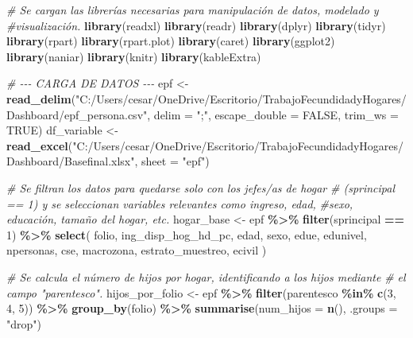 \documentclass[
]{article}
\newenvironment{Shaded}{\begin{snugshade}}{\end{snugshade}}
\newcommand{\AttributeTok}[1]{\textcolor[rgb]{0.13,0.29,0.53}{#1}}
\newcommand{\CommentTok}[1]{\textcolor[rgb]{0.56,0.35,0.01}{\textit{#1}}}
\newcommand{\ConstantTok}[1]{\textcolor[rgb]{0.56,0.35,0.01}{#1}}
\newcommand{\DecValTok}[1]{\textcolor[rgb]{0.00,0.00,0.81}{#1}}
\newcommand{\FunctionTok}[1]{\textcolor[rgb]{0.13,0.29,0.53}{\textbf{#1}}}
\newcommand{\NormalTok}[1]{#1}
\newcommand{\OtherTok}[1]{\textcolor[rgb]{0.56,0.35,0.01}{#1}}
\newcommand{\SpecialCharTok}[1]{\textcolor[rgb]{0.81,0.36,0.00}{\textbf{#1}}}
\newcommand{\StringTok}[1]{\textcolor[rgb]{0.31,0.60,0.02}{#1}}
\begin{document}
\begin{Shaded}
\begin{Highlighting}[]
\CommentTok{\# Se cargan las librerías necesarias para manipulación de datos, modelado y }
\CommentTok{\#visualización.}
\FunctionTok{library}\NormalTok{(readxl)  }
\FunctionTok{library}\NormalTok{(readr)   }
\FunctionTok{library}\NormalTok{(dplyr)   }
\FunctionTok{library}\NormalTok{(tidyr)   }
\FunctionTok{library}\NormalTok{(rpart)   }
\FunctionTok{library}\NormalTok{(rpart.plot) }
\FunctionTok{library}\NormalTok{(caret)   }
\FunctionTok{library}\NormalTok{(ggplot2) }
\FunctionTok{library}\NormalTok{(naniar) }
\FunctionTok{library}\NormalTok{(knitr)   }
\FunctionTok{library}\NormalTok{(kableExtra)  }

\CommentTok{\# {-}{-}{-} CARGA DE DATOS {-}{-}{-}}
\NormalTok{epf }\OtherTok{\textless{}{-}} \FunctionTok{read\_delim}\NormalTok{(}\StringTok{"C:/Users/cesar/OneDrive/Escritorio/TrabajoFecundidadyHogares/Dashboard/epf\_persona.csv"}\NormalTok{, }\AttributeTok{delim =} \StringTok{";"}\NormalTok{, }
                  \AttributeTok{escape\_double =} \ConstantTok{FALSE}\NormalTok{, }\AttributeTok{trim\_ws =} \ConstantTok{TRUE}\NormalTok{)}
\NormalTok{df\_variable }\OtherTok{\textless{}{-}} \FunctionTok{read\_excel}\NormalTok{(}\StringTok{"C:/Users/cesar/OneDrive/Escritorio/TrabajoFecundidadyHogares/Dashboard/Basefinal.xlsx"}\NormalTok{,}
                          \AttributeTok{sheet =} \StringTok{"epf"}\NormalTok{)}

\CommentTok{\# Se filtran los datos para quedarse solo con los jefes/as de hogar }
\CommentTok{\# (sprincipal == 1) y se seleccionan variables relevantes como ingreso, edad, }
\CommentTok{\#sexo, educación, tamaño del hogar, etc.}
\NormalTok{hogar\_base }\OtherTok{\textless{}{-}}\NormalTok{ epf }\SpecialCharTok{\%\textgreater{}\%}
  \FunctionTok{filter}\NormalTok{(sprincipal }\SpecialCharTok{==} \DecValTok{1}\NormalTok{) }\SpecialCharTok{\%\textgreater{}\%}
  \FunctionTok{select}\NormalTok{(}
\NormalTok{    folio, ing\_disp\_hog\_hd\_pc, edad, sexo, edue, edunivel,}
\NormalTok{    npersonas, cse, macrozona, estrato\_muestreo, ecivil}
\NormalTok{  )}

\CommentTok{\# Se calcula el número de hijos por hogar, identificando a los hijos mediante }
\CommentTok{\# el campo "parentesco".}
\NormalTok{hijos\_por\_folio }\OtherTok{\textless{}{-}}\NormalTok{ epf }\SpecialCharTok{\%\textgreater{}\%}
  \FunctionTok{filter}\NormalTok{(parentesco }\SpecialCharTok{\%in\%} \FunctionTok{c}\NormalTok{(}\DecValTok{3}\NormalTok{, }\DecValTok{4}\NormalTok{, }\DecValTok{5}\NormalTok{)) }\SpecialCharTok{\%\textgreater{}\%}
  \FunctionTok{group\_by}\NormalTok{(folio) }\SpecialCharTok{\%\textgreater{}\%}
  \FunctionTok{summarise}\NormalTok{(}\AttributeTok{num\_hijos =} \FunctionTok{n}\NormalTok{(), }\AttributeTok{.groups =} \StringTok{"drop"}\NormalTok{)}


\end{Highlighting}
\end{Shaded}
\end{document}
